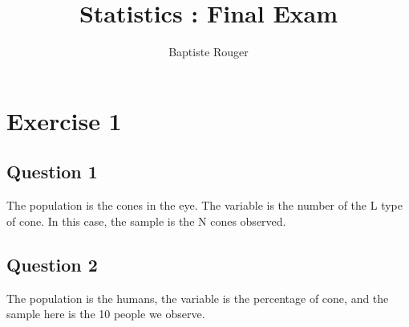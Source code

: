 \documentclass[12pt,a4paper]{article}
\author{Baptiste Rouger}
\title{Statistics : Final Exam}
\begin{document}
\section*{Exercise 1}
\subsection*{Question 1}
The population is the cones in the eye. The variable is the number of the L type of cone. In this case, the sample is the N cones observed.

\subsection*{Question 2}
The population is the humans, the variable is the percentage of cone, and the sample here is the 10 people we observe.
\end{document}
